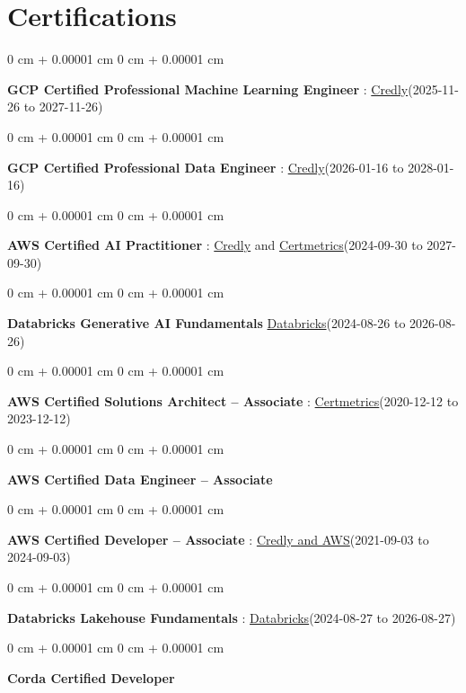 \documentclass[10pt, letterpaper]{article}
\newenvironment{onecolentry}{
    \begin{adjustwidth}{
        0 cm + 0.00001 cm
    }{
        0 cm + 0.00001 cm
    }
}{
    \end{adjustwidth}
} %
\begin{document}
    \vspace{2 pt }
    \section{Certifications}
        \vspace{2 pt }
        \begin{samepage}
            \begin{onecolentry}
                \textbf{GCP Certified Professional Machine Learning Engineer} : \href{https://www.credly.com/badges/a6965347-09ea-4d8f-b398-0e151407160d/public_url}{Credly}(2025-11-26 to 2027-11-26)
            \end{onecolentry}
            \begin{onecolentry}
                \textbf{GCP Certified Professional Data Engineer} : \href{https://www.credly.com/badges/977e96d9-12e7-4f6c-b8a7-df71fb7153b8/public_url}{Credly}(2026-01-16 to 2028-01-16)
            \end{onecolentry}
            \begin{onecolentry}
                \textbf{AWS Certified AI Practitioner} : \href{https://www.credly.com/badges/451b7ba5-8be1-4a8e-bbec-ade26627a6b6/public_url}{Credly} and \href{https://cp.certmetrics.com/amazon/en/public/verify/credential/495f0d9853874bf9a33c17f8e89ce131}{Certmetrics}(2024-09-30 to 2027-09-30)
            \end{onecolentry}
            \begin{onecolentry}
                \textbf{Databricks Generative AI Fundamentals} \href{https://sgq.io/3uIFGNi}{Databricks}(2024-08-26 to 2026-08-26)
            \end{onecolentry}
            \begin{onecolentry}
                \textbf{AWS Certified Solutions Architect – Associate} : \href{https://cp.certmetrics.com/amazon/en/public/verify/credential/SNBY48EBJJVE1SWX}{Certmetrics}(2020-12-12 to 2023-12-12)
            \end{onecolentry}
            \begin{onecolentry}
                \textbf{AWS Certified Data Engineer – Associate}
            \end{onecolentry}
            \begin{onecolentry}
                \textbf{AWS Certified Developer – Associate} : \href{https://www.credly.com/badges/b8106fbd-d3d1-4204-8cdf-e708798fd582/public_url}{Credly and AWS}(2021-09-03  to 2024-09-03)
            \end{onecolentry}
            \begin{onecolentry}
                \textbf{Databricks Lakehouse Fundamentals} : \href{https://scl.io/FXGKS0u}{Databricks}(2024-08-27 to 2026-08-27)
            \end{onecolentry}
            \begin{onecolentry}
                \textbf{Corda Certified Developer}
            \end{onecolentry}
        \end{samepage}
\end{document}
